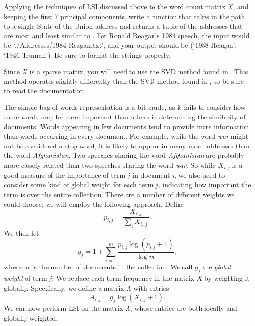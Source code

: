 \begin{problem} %
Applying the techniques of LSI discussed above to the word count matrix $X$, and keeping the first 7 principal components, write a function that takes in the path to a single State of the Union address  and returns a tuple of the addresses that are most and least similar to .
For Ronald Reagan's 1984 speech, the input would be `./Addresses/1984-Reagan.txt', and your output should be (`1988-Reagan', `1946-Truman').
Be sure to format the strings properly. 

Since $X$ is a sparse matrix, you will need to use the SVD method found in .
This method operates slightly differently than the SVD method found in , so be sure to read the documentation.
\label{prob:LSI1}
\end{problem}

The simple bag of words representation is a bit crude, as it fails to consider how some words may be more important than others in determining the similarity of documents.
Words appearing in few documents tend to provide more information than words occurring in every document.
For example, while the word \emph{war} might not be considered a stop word, it is likely to appear in many more addresses than the word \emph{Afghanistan}.
Two speeches sharing the word \emph{Afghanistan} are probably more closely related than two speeches sharing the word \emph{war}.
So while $X_{i,j}$ is a good measure of the importance of term $j$ in document $i$, we also need to consider some kind of global weight for each term $j$, indicating how important the term is over the entire collection.
There are a number of different weights we could choose; we will employ the following approach.
Define
\begin{equation*}
p_{i,j} = \frac{X_{i,j}}{\sum_{\bar{\jmath}} X_{i,\bar{\jmath}}}.
\end{equation*}
We then let
\begin{equation*}
g_{j} = 1 + \sum_{i=1}^{m} \frac{p_{i,j} \log (p_{i,j} + 1)}{\log m},
\end{equation*}
where $m$ is the number of documents in the collection.
We call $g_{j}$ the \emph{global weight} of term $j$.
We replace each term frequency in the matrix $X$ by weighting it globally.
Specifically, we define a matrix $A$ with entries
\begin{equation*}
A_{i,j} = g_{j} \log (X_{i,j} + 1).
\end{equation*}
We can now perform LSI on the matrix $A$, whose entries are both locally and globally weighted.

